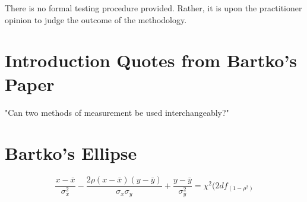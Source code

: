 \documentclass[12pt, a4paper]{report}
\theoremstyle{plain}
\theoremstyle{definition}
\theoremstyle{remark}
\begin{document}
There is no formal testing procedure provided. Rather, it is upon
the practitioner opinion to judge the outcome of the methodology.







%
%



%
%


\section*{Introduction Quotes from Bartko's Paper}
"Can two methods of measurement be used interchangeably?"


\section*{Bartko's Ellipse}

\[ \frac{x - \bar{x}}{\sigma^2_x} - \frac{2\rho(x - \bar{x})(y - \bar{y})}{\sigma_x \sigma_y} + \frac{y - \bar{y}}{\sigma^2_y} = \chi^2(2df_(1-\rho^2) \]
\end{document}
